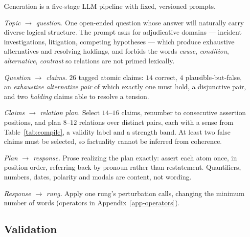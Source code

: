 \documentclass{article} %
\begin{document}
Generation is a five-stage LLM pipeline with fixed, versioned prompts.

\begin{description}[leftmargin=1.9em,itemsep=1pt,topsep=2pt]
\item[P1] \emph{Topic $\to$ question.} One open-ended question whose answer will naturally carry
  diverse logical structure. The prompt asks for adjudicative domains --- incident investigations,
  litigation, competing hypotheses --- which produce exhaustive alternatives and resolving
  holdings, and forbids the words \emph{cause}, \emph{condition}, \emph{alternative},
  \emph{contrast} so relations are not primed lexically.
\item[P2] \emph{Question $\to$ claims.} $26$ tagged atomic claims: $14$ correct, $4$
  plausible-but-false, an \emph{exhaustive alternative pair} of which exactly one must hold, a
  disjunctive pair, and two \emph{holding} claims able to resolve a tension.
\item[P3] \emph{Claims $\to$ relation plan.} Select $14$--$16$ claims, renumber to consecutive
  assertion positions, and plan $8$--$12$ relations over distinct pairs, each with a sense from
  Table~\ref{tab:compile}, a validity label and a strength band. At least two false claims must be
  selected, so factuality cannot be inferred from coherence.
\item[P4] \emph{Plan $\to$ response.} Prose realizing the plan exactly: assert each atom once, in
  position order, referring back by pronoun rather than restatement. Quantifiers, numbers, dates,
  polarity and modals are content, not wording.
\item[P5] \emph{Response $\to$ rung.} Apply one rung's perturbation calls, changing the minimum
  number of words (operators in Appendix~\ref{app-operators}).
\end{description}

\subsection{Validation}
\end{document}
